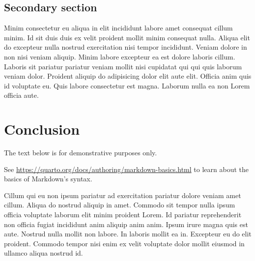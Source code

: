 \documentclass[
12pt,
openright,
oneside,
a4paper,
chapter=TITLE,
section=TITLE,
french,
spanish,
brazil,
english
]{abntex2}
\begin{document}
\hypertarget{secondary-section-1}{%
\section{Secondary section}\label{secondary-section-1}}

Minim consectetur eu aliqua in elit incididunt labore amet consequat
cillum minim. Id sit duis duis ex velit proident mollit minim consequat
nulla. Aliqua elit do excepteur nulla nostrud exercitation nisi tempor
incididunt. Veniam dolore in non nisi veniam aliquip. Minim labore
excepteur ea est dolore laboris cillum. Laboris sit pariatur pariatur
veniam mollit nisi cupidatat qui qui quis laborum veniam dolor. Proident
aliquip do adipisicing dolor elit aute elit. Officia anim quis id
voluptate eu. Quis labore consectetur est magna. Laborum nulla ea non
Lorem officia aute.


\hypertarget{conclusion}{%
\chapter{Conclusion}\label{conclusion}}

\begin{tcolorbox}[enhanced jigsaw, toptitle=1mm, colback=white, toprule=.15mm, opacitybacktitle=0.6, title=\textcolor{quarto-callout-important-color}{\faExclamation}\hspace{0.5em}{Important}, colframe=quarto-callout-important-color-frame, titlerule=0mm, leftrule=.75mm, coltitle=black, colbacktitle=quarto-callout-important-color!10!white, breakable, bottomrule=.15mm, arc=.35mm, rightrule=.15mm, opacityback=0, bottomtitle=1mm, left=2mm]

The text below is for demonstrative purposes only.

\vspace{5pt}

See \url{https://quarto.org/docs/authoring/markdown-basics.html} to
learn about the basics of Markdown's syntax.

\end{tcolorbox}

\vspace{10pt}

Cillum qui eu non ipsum pariatur ad exercitation pariatur dolore veniam
amet cillum. Aliqua do nostrud aliquip in amet. Commodo sit tempor nulla
ipsum officia voluptate laborum elit minim proident Lorem. Id pariatur
reprehenderit non officia fugiat incididunt anim aliquip anim anim.
Ipsum irure magna quis est aute. Nostrud nulla mollit non labore. In
laboris mollit ea in. Excepteur eu do elit proident. Commodo tempor nisi
enim ex velit voluptate dolor mollit eiusmod in ullamco aliqua nostrud
id.
\end{document}
